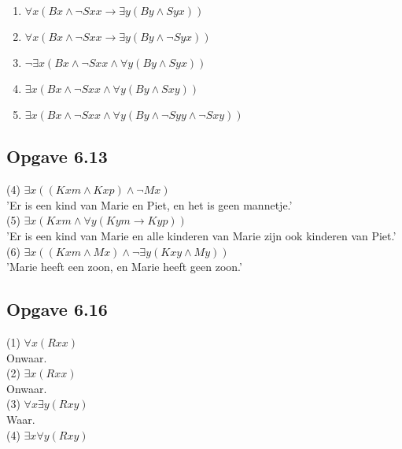 \documentclass[11pt]{article}
\newcommand{\E}{\exists}
\newcommand{\A}{\forall}
\begin{document}
\begin{enumerate}
  \item $\A x(Bx \wedge \neg Sxx \rightarrow \E y(By \wedge Syx))$
  \item $\A x(Bx \wedge \neg Sxx \rightarrow \E y(By \wedge \neg Syx))$
  \item $\neg \E x(Bx \wedge \neg Sxx \wedge \A y(By \wedge Syx))$
  \item $\E x(Bx \wedge \neg Sxx \wedge \A y(By \wedge Sxy))$
  \item $\E x(Bx \wedge \neg Sxx \wedge \A y(By \wedge \neg Syy \wedge \neg Sxy))$
\end{enumerate}


\subsection*{Opgave 6.13}

(4) $\E x((Kxm \wedge Kxp) \wedge \neg Mx)$ \\

'Er is een kind van Marie en Piet, en het is geen mannetje.' \\

(5) $\E x(Kxm \wedge \A y(Kym \rightarrow Kyp))$ \\

'Er is een kind van Marie
en alle kinderen van Marie zijn ook kinderen van Piet.' \\

(6) $\E x((Kxm \wedge Mx) \wedge \neg \E y(Kxy \wedge My))$ \\

'Marie heeft een zoon, en Marie heeft geen zoon.' \\


\subsection*{Opgave 6.16}

(1) $\A x(Rxx)$ \\

Onwaar. \\

(2) $\E x(Rxx)$ \\

Onwaar. \\

(3) $\A x \E y(Rxy)$ \\

Waar. \\

(4) $\E x \A y(Rxy)$ \\
\end{document}
